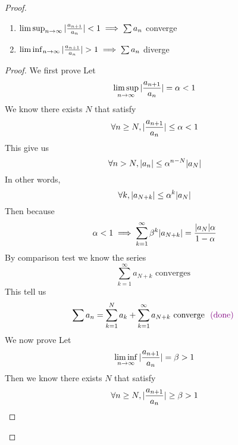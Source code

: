 \documentclass{report}
\begin{document}
\begin{proof}
\begin{theorem}
\begin{enumerate}[label=(\alph*)]
  \item  $\limsup_{n\to\infty} |\frac{a_{n+1}}{a_n}|<1\implies \sum a_n$ converge\\
  \item $\liminf_{n\to\infty} \abso{\frac{a_{n+1}}{a_n}}> 1\implies \sum a_n$ diverge
\end{enumerate}
\end{theorem}
\begin{proof}
We first prove 
Let 
\begin{equation}
\limsup_{n\to\infty} |\frac{a_{n+1}}{a_n}|=\alpha <1
\end{equation}
We know there exists $N$ that satisfy
 \begin{equation}
\forall n\geq N, |\frac{a_{n+1}}{a_n}|\leq \alpha <1
\end{equation}
This give us
\begin{equation}
\forall n>N, |a_n|\leq \alpha ^{n-N}|a_N|
\end{equation}
In other words,
\begin{equation}
\forall k, |a_{N+k}|\leq \alpha ^{k}|a_N|
\end{equation}
Then because
\begin{equation}
\alpha <1\implies \sum_{k=1}^\infty \beta^{k} |a_{N+k}|=\frac{|a_N|\alpha  }{1-\alpha  }
\end{equation}
By comparison test we know the series
\begin{equation}
\sum_{k=1}^\infty a_{N+k}\text{ converges }
\end{equation}
This tell us
\begin{equation}
\sum a_n=\sum_{k=1}^N a_k+ \sum_{k=1}^\infty a_{N+k}\text{ converge }\textcolor{violet}{\text{ (done) }}
\end{equation}
We now prove 
Let 
\begin{equation}
\liminf_{n\to\infty} |\frac{a_{n+1}}{a_n}|=\beta >1
\end{equation}
Then we know there exists $N$ that satisfy
 \begin{equation}
\forall n\geq N, |\frac{a_{n+1}}{a_n}|\geq \beta >1
\end{equation}

\end{proof}
\end{proof}
\end{document}
